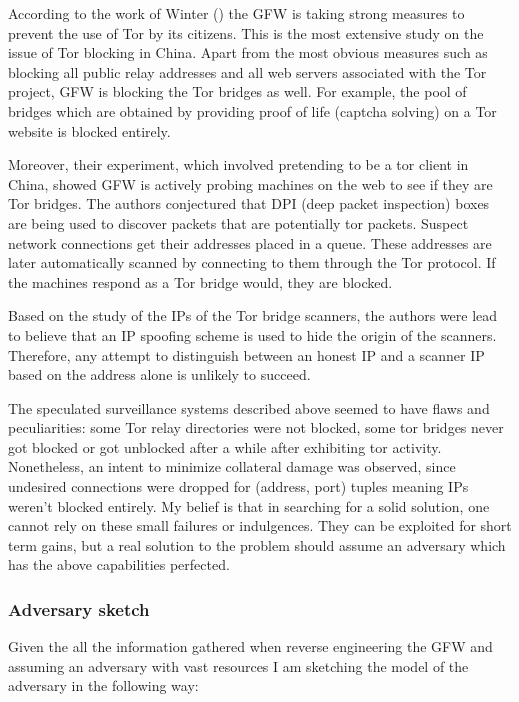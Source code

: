 \documentclass[11pt]{article} %
\begin{document}
According to the work of Winter (\citep*{winterInChina}) the GFW is taking strong measures to prevent the use of Tor by its citizens. This is the most extensive study on the issue of Tor blocking in China. Apart from the most obvious measures such as blocking all public relay addresses and all web servers associated with the Tor project, GFW is blocking the Tor bridges as well. For example, the pool of bridges which are obtained by providing proof of life (captcha solving) on a Tor website is blocked entirely. 

Moreover, their experiment, which involved pretending to be a tor client in China, showed GFW is actively probing machines on the web to see if they are Tor bridges. The authors conjectured that DPI (deep packet inspection) boxes are being used to discover packets that are potentially tor packets. Suspect network connections get their addresses placed in a queue. These addresses are later automatically scanned by connecting to them through the Tor protocol. If the machines respond as a Tor bridge would, they are blocked.

Based on the study of the IPs of the Tor bridge scanners, the authors were lead to believe that an IP spoofing scheme is used to hide the origin of the scanners. Therefore, any attempt to distinguish between an honest IP and a scanner IP based on the address alone is unlikely to succeed. 

The speculated surveillance systems described above seemed to have flaws and peculiarities: some Tor relay directories were not blocked, some tor bridges never got blocked or got unblocked after a while after exhibiting tor activity. Nonetheless, an intent to minimize collateral damage was observed, since undesired connections were dropped for (address, port) tuples meaning IPs weren’t blocked entirely.  My belief is that in searching for a solid solution, one cannot rely on these small failures or indulgences. They can be exploited for short term gains, but a real solution to the problem should assume an adversary which has the above capabilities perfected.

\subsubsection{Adversary sketch}

Given the all the information gathered when reverse engineering the GFW and assuming an adversary with vast resources I am sketching the model of the adversary in the following way:
\end{document}
